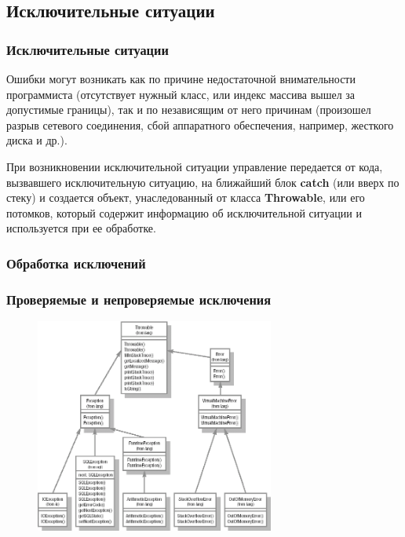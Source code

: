 \documentclass[default]{beamer}
\begin{document}
	\subsection{Исключительные ситуации}
	\begin{frame}
		\frametitle{Исключительные ситуации}
		
		Ошибки могут возникать как по причине недостаточной внимательности программиста (отсутствует нужный класс, или индекс массива вышел за допустимые границы), так и по независящим от него причинам (произошел разрыв сетевого соединения, сбой аппаратного обеспечения, например, жесткого диска и др.).
		
		\par\bigskip
		При возникновении исключительной ситуации управление передается от кода, вызвавшего исключительную ситуацию, на ближайший блок \textbf{catch} (или вверх по стеку) и создается объект, унаследованный от класса \textbf{Throwable}, или его потомков, который содержит информацию об исключительной ситуации и используется при ее обработке.
	\end{frame}

	\begin{frame}
		\frametitle{Обработка исключений}
		
		\lstExceptions
	\end{frame}

	\begin{frame}
		\frametitle{Проверяемые и непроверяемые исключения}
		
		\begin{figure}
			\includegraphics[width=0.7\textwidth]{exceptions.png}
		\end{figure}
	\end{frame}
\end{document}
